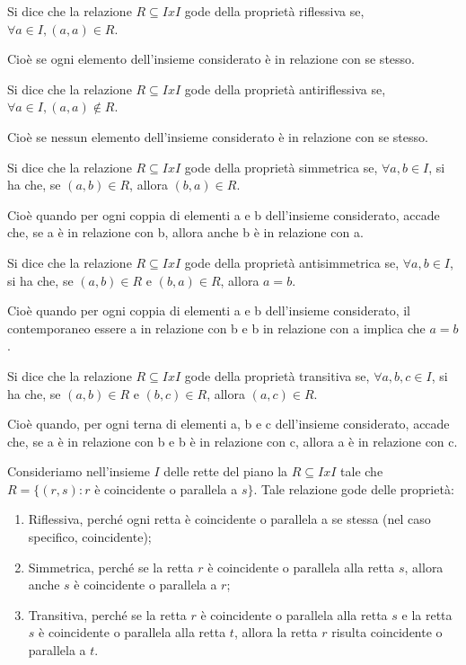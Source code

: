 \begin{definition}[Riflessiva]
    Si dice che la relazione $R\subseteq IxI$ gode della proprietà riflessiva se, $\forall a\in I, (a, a)\in R$.
\end{definition} 
Cioè se ogni elemento dell’insieme considerato è in relazione con se stesso.

\begin{definition}[Antiriflessiva]
    Si dice che la relazione $R\subseteq IxI$ gode della proprietà antiriflessiva se, $\forall a\in I, (a, a)\notin R$.
\end{definition}
Cioè se nessun elemento dell’insieme considerato è in relazione con se stesso.

\begin{definition}[Simmetrica]
    Si dice che la relazione $R\subseteq IxI$ gode della proprietà simmetrica se, $\forall a,b\in I$, si ha che, se $(a, b)\in R$, allora $(b, a)\in R$.
\end{definition}
Cioè quando per ogni coppia di elementi a e b dell’insieme considerato, accade che, se a è in relazione con b, allora anche b è in relazione con a.

\begin{definition}[Antisimmetrica]
    Si dice che la relazione $R\subseteq IxI$ gode della proprietà antisimmetrica se, $\forall a,b\in I$, si ha che, se $(a, b)\in R$ e $(b, a)\in R$, allora $a = b$.
\end{definition}
Cioè quando per ogni coppia di elementi a e b dell’insieme considerato, il contemporaneo essere a in relazione con b e b in relazione con a implica che $a = b$.

\begin{definition}
    Si dice che la relazione $R\subseteq IxI$ gode della proprietà transitiva se, $\forall a,b,c\in I$, si ha che, se $(a, b)\in R$ e $(b, c)\in R$, allora $(a, c)\in R$.
\end{definition}
Cioè quando, per ogni terna di elementi a, b e c dell’insieme considerato, accade che, se a è in relazione con b e b è in relazione con c, allora a è in relazione con c.

\begin{example}
    Consideriamo nell’insieme $I$ delle rette del piano la $R\subseteq IxI$ tale che $R = \{(r, s): r$ è coincidente o parallela a $s\}$. Tale relazione gode delle proprietà: 
    \begin{enumerate}
        \item Riflessiva, perché ogni retta è coincidente o parallela a se stessa (nel caso specifico, coincidente);
        \item Simmetrica, perché se la retta $r$ è coincidente o parallela alla retta $s$, allora anche $s$ è coincidente o parallela a $r$;
        \item Transitiva, perché se la retta $r$ è coincidente o parallela alla retta $s$ e la retta $s$ è coincidente o parallela alla retta $t$, allora la retta $r$ risulta coincidente o parallela a $t$.
    \end{enumerate}
\end{example}

